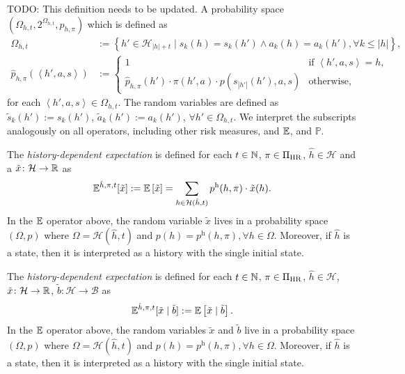 TODO: This definition needs to be updated. 
A probability space $(\Omega_{h,t}, 2^{\Omega_{h,t} }, \hat{p}_{h,\pi})$ which is defined as
\begin{align}
\label{eq:omega-def}
  \Omega_{h,t} &:= \left\{ h' \in \mathcal{H}_{|h| + t} \mid s_k(h) = s_k(h') \wedge a_k(h) = a_k(h'), \forall k \le |h| \right\}, \\
  \label{eq:phat-def}
\hat{p}_{h,\pi}\left(\left< h', a, s \right>\right)
&:= \begin{cases}
1 &\text{if } \left< h', a, s \right> = h, \\
\hat{p}_{h,\pi}(h') \cdot  \pi(h', a) \cdot p(s_{|h'|}(h'), a, s)
&\text{otherwise},
\end{cases}
\end{align}
for each $\left< h', a, s \right> \in \Omega_{h,t}$. The random variables are defined as $\tilde{s}_k(h') := s_k(h')$, $\tilde{a}_k(h') := a_k(h')$, $\forall h'\in \Omega_{h,t}$. We interpret the subscripts analogously on all operators, including other risk measures, and $\mathbb{E}$, and $\mathbb{P}$.



\begin{definition}\label{def:expect-h}
The \emph{history-dependent expectation} is defined for each $t\in \mathbb{N}$, $\pi\in \Pi_{\mathrm{HR}}$, $\hat{h}\in \mathcal{H}$ and a $\tilde{x}\colon \mathcal{H} \to \mathbb{R}$ as
\begin{equation*}
\mathbb{E}^{\hat{h}, \pi, t} [\tilde{x}]
:= \mathbb{E} \left[ \tilde{x} \right] 
= \sum_{h \in \mathcal{H}(\hat{h}, t)} p^{\mathrm{h}}(h, \pi) \cdot \tilde{x}(h).
\end{equation*}
In the $\mathbb{E}$ operator above, the random variable $\tilde{x}$ lives in a probability space $(\Omega, p)$ where $\Omega = \mathcal{H}(\hat{h}, t)$ and $p(h) = p^{\mathrm{h}}(h, \pi), \forall h\in \Omega$.
Moreover, if $\hat{h}$ is a state, then it is interpreted as a history with the single initial state.
\end{definition}


\begin{definition}\label{def:expect-h-cnd}
The \emph{history-dependent expectation} is defined for each $t\in \mathbb{N}$, $\pi\in \Pi_{\mathrm{HR}}$, $\hat{h}\in \mathcal{H}$, $\tilde{x}\colon \mathcal{H} \to \mathbb{R}$, $\tilde{b}\colon \mathcal{H} \to \mathcal{\mathcal{B}}$ as
\begin{equation*}
\mathbb{E}^{\hat{h}, \pi, t} [\tilde{x} \mid \tilde{b} ]
:= \mathbb{E} \left[ \tilde{x} \mid  \tilde{b} \right].
\end{equation*}
In the $\mathbb{E}$ operator above, the random variables $\tilde{x}$ and $\tilde{b}$ live in a probability space $(\Omega, p)$ where $\Omega = \mathcal{H}(\hat{h}, t)$ and $p(h) = p^{\mathrm{h}}(h, \pi), \forall h\in \Omega$.
Moreover, if $\hat{h}$ is a state, then it is interpreted as a history with the single initial state.
\end{definition}

